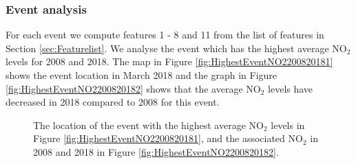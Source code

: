 \documentclass[11pt]{article}
\begin{document}
	
	\subsubsection{Event analysis}
	
	For each event we compute features 1 - 8 and 11 from the list of features in  Section \ref{sec:Featurelist}. We analyse the event which has the highest average $\text{NO}_2$ levels for 2008 and 2018. The map in Figure \ref{fig:HighestEventNO2200820181} shows the event location in March 2018 and the graph in  Figure \ref{fig:HighestEventNO2200820182} shows that the average  $\text{NO}_2$ levels have decreased in 2018 compared to 2008 for this event.


	\begin{figure}[H]
	\centering
	\caption{\footnotesize The location of the event with the highest average $\text{NO}_2$ levels in Figure \ref{fig:HighestEventNO2200820181}, and the associated $\text{NO}_2$ in 2008 and 2018 in Figure \ref{fig:HighestEventNO2200820182}. }
	\label{fig:HighestEventNO220082018}
	\end{figure}
	
\end{document}

